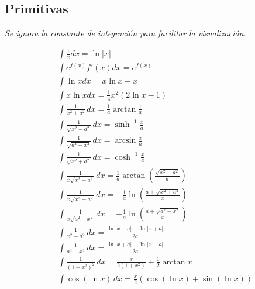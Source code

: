 \subsection{Primitivas}
\textit{Se ignora la constante de integración para facilitar la visualización.}\newline
\begin{minipage}{0.55\textwidth}
\begin{equation}
\begin{split}
    &\int\frac{1}{x}dx  = \ln{|x|} \\
    &\int e^{f(x)}f'(x)dx  = e^{f(x)} \\
    &\int \ln{x}dx  = x\ln{x}-x \\
    &\int x\ln{x}dx  = \frac{1}{4}x^2(2\ln{x}-1) \\
    &\int\frac{1}{x^2+a^2}\,dx  = \frac{1}{a}\arctan{\frac{1}{a}}\\
    &\int\frac{1}{\sqrt{x^2-a^2}}\,dx  = \sinh^{-1}{\frac{x}{a}}\\
    &\int\frac{1}{\sqrt{a^2-x^2}}\,dx  = \arcsin{\frac{x}{a}}\\
    &\int \frac{1}{\sqrt{x^2+a^2}}\,dx  = \cosh^{-1}{\frac{x}{a}}\\
    &\int\frac{1}{x\sqrt{x^2-a^2}}\,dx  = \frac{1}{a}\arctan{\left(\frac{\sqrt{x^2-a^2}}{a}\right)}\\
    &\int\frac{1}{x\sqrt{x^2+a^2}}\,dx  = -\frac{1}{a}\ln{\left(\frac{
    a+\sqrt{x^2+a^2}}{x}\right)}\\
    &\int\frac{1}{x\sqrt{a^2-x^2}}\,dx  = -\frac{1}{a}\ln{\left(\frac{a+\sqrt{a^2-x^2}}{x}\right)}\\
    &\int\frac{1}{x^2-a^2}\,dx  = \frac{\ln{|x-a|}-\ln{|x+a|}}{2a}\\
    &\int\frac{1}{a^2-x^2}\,dx  = \frac{\ln{|x+a|}-\ln{|x-a|}}{2a}\\
    &\int\frac{1}{(1+x^2)^2}\,dx  = \frac{x}{2(1+x^2)}+\frac{1}{2}\arctan{x}\\
    &\int\cos{(\ln{x})}\,dx= \frac{x}{2}(\cos{(\ln{x})}+\sin{(\ln{x})})\\
\end{split}
\nonumber
\end{equation}
\end{minipage}
